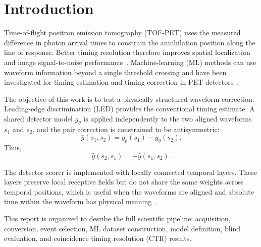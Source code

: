 \section*{Introduction}

Time-of-flight positron emission tomography (TOF-PET) uses the measured difference in photon arrival times to constrain the annihilation position 
along the line of response. 
Better timing resolution therefore improves spatial localization and image signal-to-noise performance~\cite{surti2015}. 
Machine-learning (ML) methods can use waveform information beyond a single threshold crossing and have been investigated 
for timing estimation and timing correction in PET detectors~\cite{berg2018,onishi2022}.

The objective of this work is to test a physically structured waveform correction. Leading-edge discrimination (LED) provides 
the conventional timing estimate. A shared detector model \(g_\theta\) is applied independently to the two aligned waveforms 
\(s_1\) and \(s_2\), and the pair correction is constrained to be antisymmetric:
\begin{equation}
    \widehat{y}(s_1,s_2)
    =
    g_\theta(s_1)-g_\theta(s_2).
\end{equation}
Thus,
\begin{equation}
    \widehat{y}(s_2,s_1)=-\widehat{y}(s_1,s_2).
\end{equation}

The detector scorer is implemented with locally connected temporal layers. These layers preserve local receptive fields but do not 
share the same weights across temporal positions, which is useful when the waveforms are aligned and absolute time within the waveform 
has physical meaning~\cite{elsayed2020,amit2019}.

This report is organized to desribe the full scientific pipeline: acquisition, conversion, event selection, ML dataset construction, 
model definition, blind evaluation, and coincidence timing resolution (CTR) results.


